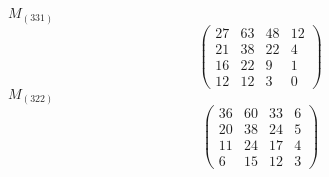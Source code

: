 \documentclass[12pt,reqno]{amsart}
\begin{document}
$M_{(331)}$                             $$ \begin{pmatrix} 
                         27 & 63 & 48 & 12 \\[6pt]
                         21 & 38 & 22 & 4 \\[6pt]
                          16 & 22 & 9 & 1 \\[6pt]
                            12 & 12 & 3 & 0
                              \end{pmatrix} $$ 
$M_{(322)}$                             $$ \begin{pmatrix} 
                         36 & 60 & 33 & 6 \\[6pt]
                         20 & 38 & 24 & 5 \\[6pt]
                         11 & 24 & 17 & 4 \\[6pt]
                            6 & 15 & 12 & 3
                              \end{pmatrix} $$ 
\end{document}
